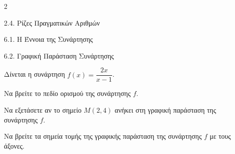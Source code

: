 \begin{ylh}{2}
    \item 2.4. Ρίζες Πραγματικών Αριθμών
    \item 6.1. Η Έννοια της Συνάρτησης
    \item 6.2. Γραφική Παράσταση Συνάρτησης
\end{ylh}
Δίνεται η συνάρτηση $f(x) = \dfrac{2x}{x - 1}$.
\begin{alist}
\item Να βρείτε το πεδίο ορισμού της συνάρτησης $f$.
\item Να εξετάσετε αν το σημείο $M(2,4)$ ανήκει στη γραφική παράσταση της συνάρτησης $f$.
\item Να βρείτε τα σημεία τομής της γραφικής παράσταση της συνάρτησης $f$ με τους άξονες.
\end{alist}


